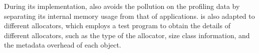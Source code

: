 \begin{comment}
Challenge 2: how to perform the profiling? Similar to existing work, we majorly use the time (supported by RTDSC), the number (instrumentation-based counting), and some hardware events (PMU events) to perform the sampling. The sampling approach will be similar to existing work, but we attribute those events to the memory management events, such as allocations and deallocations. 

Challenge 3: how to reduce the performance overhead? In order to reduce the number of cache contention, we re-design our data structure to avoid false sharing and true sharing as much as possible. Also, we 

Challenge 4: we propose a novel method to evaluate the application friendliness. We evaluate the cache friendliness, or TLB friendliness. 

Challenge 5: we employs an internal allocator to avoid the interfering with allocations and deallocations of applications.  

 
\MP{} utilizes multiple methods to minimize the performance overhead of the profiling.  

\end{comment}

During its implementation, \MP{} also avoids the pollution on the profiling data by separating its internal memory usage from that of applications. \MP{} is also adapted to different allocators, which employs a  test program to obtain the details of different allocators, such as the type of the allocator, size class information, and the metadata overhead of each object. 


\begin{comment}

1. Maybe we should detect the contention rate. If the last write is from a different thread, we will detect one contention. 
 
allocator: can we use some different configurations of the same allocator?
Can we use the same allocator on different applications, achieving different allocators?  
}





performance overhead: 
1. Using the hash maps to identify the size of each object is very slow. 
2. Turning multiple reads into one read around 2 or three times. 
3. Using the new mapping mechanism. 

How we can do that for glibc. We migrate the glibc as separate library, allowing us to intercept system or libraries. 

How to figure out the metadata information?
	
\end{comment}

 

